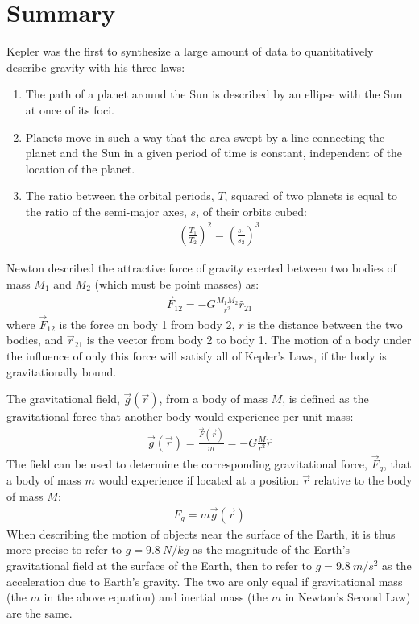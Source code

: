 \section{Summary}
\begin{chapterSummary}
Kepler was the first to synthesize a large amount of data to quantitatively describe gravity with his three laws:
\begin{enumerate}
\item The path of a planet around the Sun is described by an ellipse with the Sun at once of its foci.
\item Planets move in such a way that the area swept by a line connecting the planet and the Sun in a given period of time is constant, independent of the location of the planet.
\item The ratio between the orbital periods, $T$, squared of two planets is equal to the ratio of the semi-major axes, $s$, of their orbits cubed:
\begin{align*}
\left(\frac{T_1}{T_2}\right)^2=\left(\frac{s_1}{s_2}\right)^3
\end{align*}
\end{enumerate}

Newton described the attractive force of gravity exerted between two bodies of mass $M_1$ and $M_2$ (which must be point masses) as:
\begin{align*}
\vec F_{12}=-G\frac{M_1M_2}{r^2}\hat r_{21}
\end{align*}
where $\vec F_{12}$ is the force on body 1 from body 2, $r$ is the distance between the two bodies, and $\vec r_{21}$ is the vector from body 2 to body 1. The motion of a body under the influence of only this force will satisfy all of Kepler's Laws, if the body is gravitationally bound.

The gravitational field, $\vec g(\vec r)$, from a body of mass $M$, is defined as the gravitational force that another body would experience per unit mass:
\begin{align*}
\vec g(\vec r)=\frac{\vec F(\vec r)}{m}=-G\frac{M}{r^2}\hat r
\end{align*}
The field can be used to determine the corresponding gravitational force, $\vec F_g$, that a body of mass $m$ would experience if located at a position $\vec r$ relative to the body of mass $M$:
\begin{align*}
F_g = m \vec g(\vec r)
\end{align*}
When describing the motion of objects near the surface of the Earth, it is thus more precise to refer to $g=\SI{9.8}{N/kg}$ as the magnitude of the Earth's gravitational field at the surface of the Earth, then to refer to $g=\SI{9.8}{m/s^2}$ as the acceleration due to Earth's gravity. The two are only equal if gravitational mass (the $m$ in the above equation) and inertial mass (the $m$ in Newton's Second Law) are the same. \\


\end{chapterSummary}
